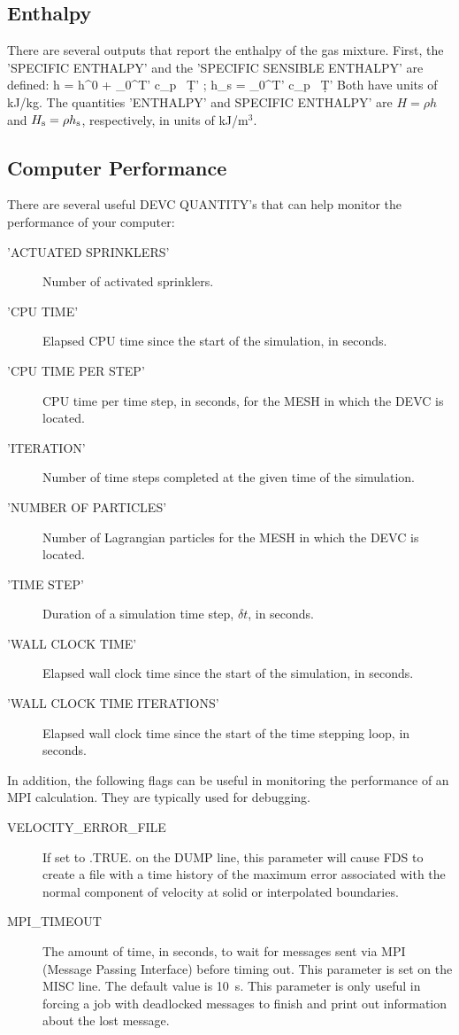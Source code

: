\documentclass[11pt]{book}
\begin{document}
\subsection{Enthalpy}
\label{info:enthalpy}

There are several outputs that report the enthalpy of the gas mixture. First, the {\ct 'SPECIFIC ENTHALPY'} and the {\ct 'SPECIFIC SENSIBLE ENTHALPY'} are defined:
\be
   h = h^0 + \int_0^{T'} c_p \, \d T'  \quad ; \quad h_{\rm s} = \int_0^{T'} c_p \, \d T'
\ee
Both have units of kJ/kg. The quantities {\ct 'ENTHALPY'} and {\ct SPECIFIC ENTHALPY'} are $H=\rho h$ and $H_{\rm s}=\rho h_{\rm s}$, respectively, in units of kJ/m$^3$.


\subsection{Computer Performance}
\label{info:TIMING}

There are several useful {\ct DEVC} {\ct QUANTITY}'s that can help monitor the performance of your computer:
\begin{description}
\item[{\ct 'ACTUATED SPRINKLERS'}] Number of activated sprinklers.
\item[{\ct 'CPU TIME'}] Elapsed CPU time since the start of the simulation, in seconds.
\item[{\ct 'CPU TIME PER STEP'}] CPU time per time step, in seconds, for the {\ct MESH} in which the {\ct DEVC} is located.
\item[{\ct 'ITERATION'}] Number of time steps completed at the given time of the simulation.
\item[{\ct 'NUMBER OF PARTICLES'}] Number of Lagrangian particles for the {\ct MESH} in which the {\ct DEVC} is located.
\item[{\ct 'TIME STEP'}] Duration of a simulation time step, $\delta t$, in seconds.
\item[{\ct 'WALL CLOCK TIME'}] Elapsed wall clock time since the start of the simulation, in seconds.
\item[{\ct 'WALL CLOCK TIME ITERATIONS'}] Elapsed wall clock time since the start of the time stepping loop, in seconds.
\end{description}
In addition, the following flags can be useful in monitoring the performance of an MPI calculation. They are typically used for debugging.
\begin{description}
\item[{\ct VELOCITY\_ERROR\_FILE}] If set to {\ct .TRUE.} on the {\ct DUMP} line, this parameter will cause FDS to create a file with a time history of the maximum error associated with the normal component of velocity at solid or interpolated boundaries.
\item[{\ct MPI\_TIMEOUT}] The amount of time, in seconds, to wait for messages sent via MPI (Message Passing Interface) before timing out. This parameter is set on the {\ct MISC} line. The default value is 10~s. This parameter is only useful in forcing a job with deadlocked messages to finish and print out information about the lost message.
\end{description}
\end{document}
